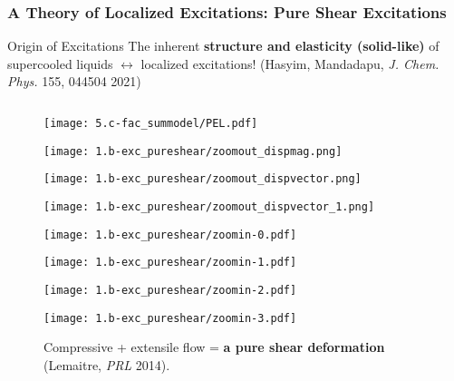 \begin{frame}[c]\label{b.1}
\frametitle{A Theory of Localized Excitations: Pure Shear Excitations}

\vspace{-0.5em}
\begin{block}{\centering \large Origin of Excitations }
\centering The inherent \textbf{structure and elasticity (solid-like)} of supercooled liquids $\leftrightarrow$ localized excitations! {\footnotesize (Hasyim, Mandadapu,  \textit{J. Chem. Phys.} 155, 044504 2021)}
\end{block}
\vspace{-0.5em}
\begin{columns}[T]
\begin{column}[T]{0.4\textwidth}

\begin{figure}[t]

\begin{overprint}
\centering\texttt{[image: 5.c-fac\_summodel/PEL.pdf]}\caption{Glassy dynamics is hopping between energy minima (inherent states)  (Stillinger and Weber, \textit{Phys. Rev. A} 1982)}

\centering\texttt{[image: 1.b-exc\_pureshear/zoomout\_dispmag.png]}\caption{Excitations of a model glass former, detected by the initial dynamic heterogeneity.}

\centering\texttt{[image: 1.b-exc\_pureshear/zoomout\_dispvector.png]}\caption{The displacement vector field due to excitations in the liquid.}

\centering\texttt{[image: 1.b-exc\_pureshear/zoomout\_dispvector\_1.png]}\caption{The displacement field vector field due to excitations in the liquid.}

\centering\texttt{[image: 1.b-exc\_pureshear/zoomin-0.pdf]}\caption{An excitation reorganizes the surrounding solid medium.}

\centering\texttt{[image: 1.b-exc\_pureshear/zoomin-1.pdf]}\caption{In one axis, there's compressive flow.}

\centering\texttt{[image: 1.b-exc\_pureshear/zoomin-2.pdf]}\caption{In another axis, there's extensile flow.}

\centering\texttt{[image: 1.b-exc\_pureshear/zoomin-3.pdf]}\caption{Compressive + extensile flow = \textbf{a pure shear deformation} {\footnotesize (Lemaitre, \textit{PRL} 2014).}}


\end{overprint}
\end{figure}
\end{column}
\end{columns}
\end{frame}
